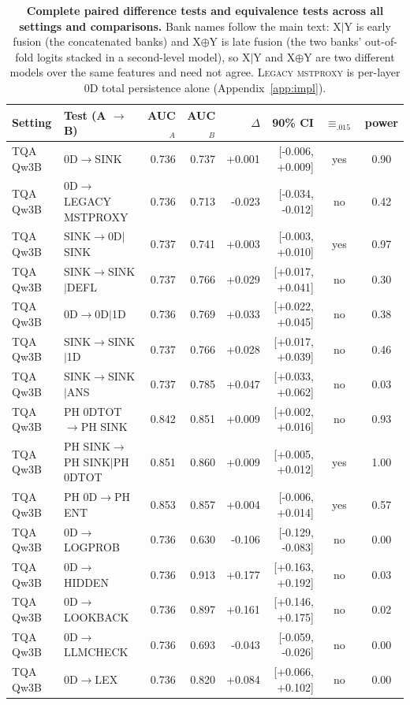 \begin{longtable}{llrrrrcc}
\caption{\textbf{Complete paired difference tests and equivalence tests across all settings and comparisons.} Bank names follow the main text: X$\mid$Y is early fusion (the concatenated banks) and X$\oplus$Y is late fusion (the two banks' out-of-fold logits stacked in a second-level model), so X$\mid$Y and X$\oplus$Y are two different models over the same features and need not agree. \textsc{Legacy mstproxy} is per-layer $0$D total persistence alone (Appendix~\ref{app:impl}).}\label{tab:tests_full}\\
\toprule
Setting & Test (A $\to$ B) & AUC$_A$ & AUC$_B$ & $\Delta$ & 90\% CI & $\equiv_{.015}$ & power \\
\midrule\endhead
TQA Qw3B & 0D$\to$SINK & 0.736 & 0.737 & +0.001 & [-0.006, +0.009] & yes & 0.90 \\
TQA Qw3B & 0D$\to$LEGACY MSTPROXY & 0.736 & 0.713 & -0.023 & [-0.034, -0.012] & no & 0.42 \\
TQA Qw3B & SINK$\to$0D$\mid$SINK & 0.737 & 0.741 & +0.003 & [-0.003, +0.010] & yes & 0.97 \\
TQA Qw3B & SINK$\to$SINK$\mid$DEFL & 0.737 & 0.766 & +0.029 & [+0.017, +0.041] & no & 0.30 \\
TQA Qw3B & 0D$\to$0D$\mid$1D & 0.736 & 0.769 & +0.033 & [+0.022, +0.045] & no & 0.38 \\
TQA Qw3B & SINK$\to$SINK$\mid$1D & 0.737 & 0.766 & +0.028 & [+0.017, +0.039] & no & 0.46 \\
TQA Qw3B & SINK$\to$SINK$\mid$ANS & 0.737 & 0.785 & +0.047 & [+0.033, +0.062] & no & 0.03 \\
TQA Qw3B & PH 0DTOT$\to$PH SINK & 0.842 & 0.851 & +0.009 & [+0.002, +0.016] & no & 0.93 \\
TQA Qw3B & PH SINK$\to$PH SINK$\mid$PH 0DTOT & 0.851 & 0.860 & +0.009 & [+0.005, +0.012] & yes & 1.00 \\
TQA Qw3B & PH 0D$\to$PH ENT & 0.853 & 0.857 & +0.004 & [-0.006, +0.014] & yes & 0.57 \\
TQA Qw3B & 0D$\to$LOGPROB & 0.736 & 0.630 & -0.106 & [-0.129, -0.083] & no & 0.00 \\
TQA Qw3B & 0D$\to$HIDDEN & 0.736 & 0.913 & +0.177 & [+0.163, +0.192] & no & 0.03 \\
TQA Qw3B & 0D$\to$LOOKBACK & 0.736 & 0.897 & +0.161 & [+0.146, +0.175] & no & 0.02 \\
TQA Qw3B & 0D$\to$LLMCHECK & 0.736 & 0.693 & -0.043 & [-0.059, -0.026] & no & 0.00 \\
TQA Qw3B & 0D$\to$LEX & 0.736 & 0.820 & +0.084 & [+0.066, +0.102] & no & 0.00 \\

\end{longtable}
